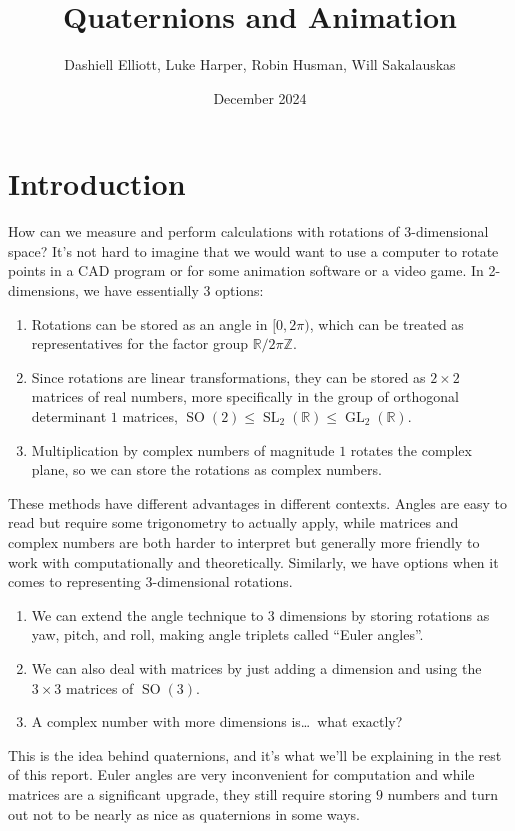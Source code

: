 \documentclass[12pt, letterpaper]{article}
\title{Quaternions and Animation}
\author{Dashiell Elliott, Luke Harper, Robin Husman, Will Sakalauskas}
\date{December 2024}
\newcommand{\bbR}{\mathbb{R}}
\newcommand{\bbZ}{\mathbb{Z}}
\DeclareMathOperator\GL{GL}
\DeclareMathOperator\SL{SL}
\DeclareMathOperator\SO{SO}
\begin{document}
\maketitle

\section{Introduction}
How can we measure and perform calculations with rotations of 3-dimensional space?
It's not hard to imagine that we would want to use a computer to rotate points
in a CAD program or for some animation software or a video game.
In 2-dimensions, we have essentially 3 options: \begin{enumerate}
    \item Rotations can be stored as an angle in $[0,2\pi)$,
        which can be treated as representatives for the factor group $\bbR/2\pi\bbZ$.
    \item Since rotations are linear transformations,
        they can be stored as $2\times2$ matrices of real numbers,
        more specifically in the group of orthogonal determinant $1$ matrices,
        $\SO(2) \le \SL_2(\bbR) \le \GL_2(\bbR)$.
    \item Multiplication by complex numbers of magnitude $1$ rotates the complex plane,
        so we can store the rotations as complex numbers.
\end{enumerate}
These methods have different advantages in different contexts.
Angles are easy to read but require some trigonometry to actually apply,
while matrices and complex numbers are both harder to interpret but
generally more friendly to work with computationally and theoretically.
Similarly, we have options when it comes to representing 3-dimensional rotations. \begin{enumerate}
    \item We can extend the angle technique to 3 dimensions by storing rotations
        as yaw, pitch, and roll, making angle triplets called ``Euler angles''.
    \item We can also deal with matrices by just adding a dimension and using the
        $3\times3$ matrices of $\SO(3)$.
    \item A complex number with more dimensions is\ldots\ what exactly?
\end{enumerate}
This is the idea behind quaternions, and it's what we'll be explaining in the rest of this report.
Euler angles are very inconvenient for computation and while matrices are a significant upgrade,
they still require storing $9$ numbers and turn out not to be nearly as nice as quaternions
in some ways.
\end{document}
